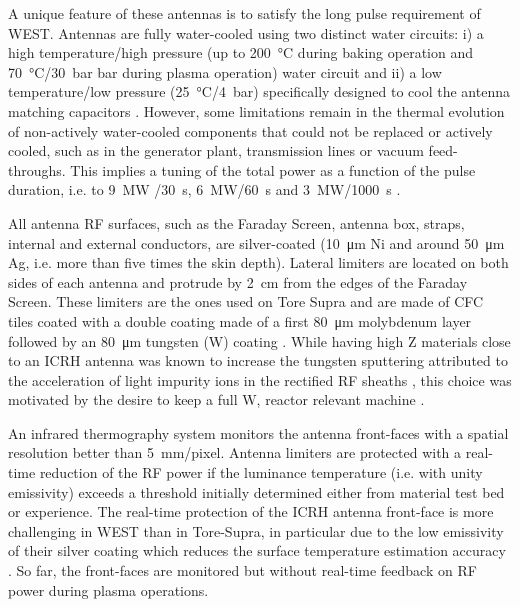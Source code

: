 \documentclass[12p]{iopart}
\begin{document}
A unique feature of these antennas is to satisfy the long pulse requirement of WEST. Antennas are fully water-cooled using two distinct water circuits: i) a high temperature/high pressure (up to \SI{200}{\celsius} during baking operation and \SI{70}{\celsius}/\SI{30}{\bar} bar during plasma operation) water circuit and ii) a low temperature/low pressure (\SI{25}{\celsius}/\SI{4}{\bar}) specifically designed to cool the antenna matching capacitors \cite{chen2015,vulliez2015}. However, some limitations remain in the thermal evolution of non-actively water-cooled components that could not be replaced or actively cooled, such as in the generator plant, transmission lines or vacuum feed-throughs. This implies a tuning of the total power as a function of the pulse duration, i.e. to \SI{9}{\mega\watt} /\SI{30}{\second}, \SI{6}{\mega\watt}/\SI{60}{\second} and \SI{3}{\mega\watt}/\SI{1000}{\second} \cite{hillairet2015-2}.

All antenna RF surfaces, such as the Faraday Screen, antenna box, straps, internal and external conductors, are silver-coated (\SI{10}{\micro\meter} Ni and around \SI{50}{\micro\meter} Ag, i.e. more than five times the skin depth). Lateral limiters are located on both sides of each antenna and protrude by \SI{2}{\centi\meter} from the edges of the Faraday Screen. These limiters are the ones used on Tore Supra and are made of CFC tiles coated with a double coating made of a first \SI{80}{\micro\meter} molybdenum layer followed by an \SI{80}{\micro\meter} tungsten (W) coating \cite{firdaouss2017-1, firdaouss2017}. While having high Z materials close to an ICRH antenna was known to increase the tungsten sputtering attributed to the acceleration of light impurity ions in the rectified RF sheaths \cite{bobkov2010}, this choice was motivated by the desire to keep a full W, reactor relevant machine \cite{bucalossi2014}.

An infrared thermography system monitors the antenna front-faces with a spatial resolution better than \SI{5}{\milli\metre}/pixel\cite{courtois2019}. Antenna limiters are protected with a real-time reduction of the RF power if the luminance temperature (i.e. with unity emissivity) exceeds a threshold initially determined either from material test bed or experience. The real-time protection of the ICRH antenna front-face is more challenging in WEST than in Tore-Supra\cite{colas2009}, in particular due to the low emissivity of their silver coating which reduces the surface temperature estimation accuracy \cite{aumeunier2021}. So far, the front-faces are monitored but without real-time feedback on RF power during plasma operations.
\end{document}
